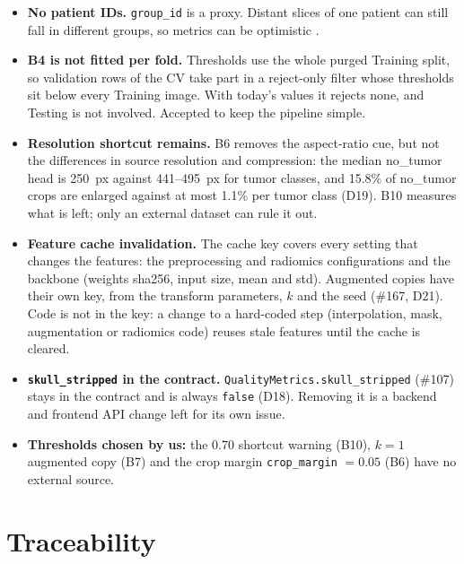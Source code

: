 \documentclass[11pt,a4paper]{article}
\newcommand{\board}[1]{\textsf{\##1}}
\begin{document}
\begin{itemize}
  \item \textbf{No patient IDs.} \texttt{group\_id} is a proxy. Distant slices of one patient can still fall in different groups, so metrics can be optimistic \cite{r3}.
  \item \textbf{B4 is not fitted per fold.} Thresholds use the whole purged Training split, so validation rows of the CV take part in a reject-only filter whose thresholds sit below every Training image. With today's values it rejects none, and Testing is not involved. Accepted to keep the pipeline simple.
  \item \textbf{Resolution shortcut remains.} B6 removes the aspect-ratio cue, but not the differences in source resolution and compression: the median no\_tumor head is 250~px against 441--495~px for tumor classes, and 15.8\% of no\_tumor crops are enlarged against at most 1.1\% per tumor class (D19). B10 measures what is left; only an external dataset can rule it out.
  \item \textbf{Feature cache invalidation.} The cache key covers every setting that changes the features: the preprocessing and radiomics configurations and the backbone (weights sha256, input size, mean and std). Augmented copies have their own key, from the transform parameters, $k$ and the seed (\board{167}, D21). Code is not in the key: a change to a hard-coded step (interpolation, mask, augmentation or radiomics code) reuses stale features until the cache is cleared.
  \item \textbf{\texttt{skull\_stripped} in the contract.} \texttt{QualityMetrics.skull\_stripped} (\board{107}) stays in the contract and is always \texttt{false} (D18). Removing it is a backend and frontend API change left for its own issue.
  \item \textbf{Thresholds chosen by us:} the 0.70 shortcut warning (B10), $k=1$ augmented copy (B7) and the crop margin \texttt{crop\_margin} $=0.05$ (B6) have no external source.
\end{itemize}

\section{Traceability}
\end{document}
